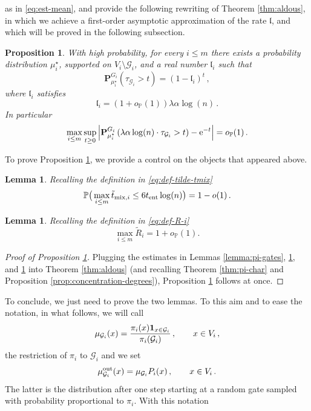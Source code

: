 \documentclass[11pt,oneside]{amsart}
\numberwithin{equation}{section}  %
\theoremstyle{plain}
\newtheorem{lemma}[theorem]{Lemma}
\newtheorem{proposition}[theorem]{Proposition}
\newcommand{\p}{\mathbb{P}}
\newcommand{\PP}{\mathbb{P}}
\newcommand{\one}{\textup{\textbf{1}}}
\newcommand{\op}{o_{\p}}
\newcommand{\tent}{t_{\textup{ent}}}
\newcommand{\quench}{\mathbf{P}}
\newcommand{\gates}{\mathcal{G}}
\newcommand{\mub}{\mu_{\gates_i}}
\newcommand{\muout}{\mu^{\rm out}_{\gates_i}}
\newcommand{\muqs}{\mu^\star_i}
\begin{document}
as in \eqref{eq:est-mean}, and provide the following rewriting of Theorem \ref{thm:aldous}, in which we achieve a first-order asymptotic approximation of the rate $\mathfrak{l}$, and which will be proved in the following subsection. 
\begin{proposition}\label{prop:rate}
	With high probability, for every $i \le m$ there exists a probability distribution $\muqs$, supported on $V_i \setminus \gates_i$, and a real number $\mathfrak{l}_i$
	such that
	\begin{equation}
		\quench^{G_i}_{\muqs} \left( \tau_{\gates_i}>t \right)=(1-\mathfrak{l}_i)^t\,,
	\end{equation}
	where $\mathfrak{l}_i$ satisfies
	\begin{equation}\label{eq:rate}
		\mathfrak{l}_i=(1+\op(1)) \lambda\alpha\log(n)\,.
	\end{equation}
	In particular
	\begin{equation}
		\max_{i \le m}\sup_{t \ge 0}\left|\quench^{G_i}_{\muqs} \left(\lambda\alpha \log(n)\cdot\tau_{\gates_i}>t \right)-{\rm e}^{-t}\right|=\op(1)\,.
	\end{equation}
\end{proposition}
To prove Proposition \ref{prop:rate}, we 
 provide a control on the objects that appeared above.
\begin{lemma}\label{lemma:T}
	Recalling the definition in \eqref{eq:def-tilde-tmix}
	\begin{equation}\label{eq:est-T}
		\PP\big(\max_{i \le m}\tilde t_{{\rm mix},i}\le 6\tent\log(n)\big)=1-o(1)\,.
	\end{equation}
\end{lemma}
\begin{lemma}\label{lemma:R-new}
	Recalling the definition in \eqref{eq:def-R-i}
	\begin{equation}
		\max_{i \le m}\tilde R_i=1+\op(1).
	\end{equation}
\end{lemma}
\begin{proof}[Proof of Proposition \ref{prop:rate}]
Plugging the estimates in Lemmas \ref{lemma:pi-gates}, \ref{lemma:T}, and \ref{lemma:R-new} into Theorem \ref{thm:aldous} (and recalling Theorem \ref{thm:pi-char} and Proposition \ref{prop:concentration-degrees}), Proposition \ref{prop:rate} follows at once.
\end{proof}
To conclude, we just need to prove the two lemmas. To this aim and to ease the notation, in what follows, we will call 
\begin{equation} \label{eq:5-26}
	\mub(x)=\frac{\pi_i(x)\one_{x\in\gates_i}}{\pi_i(\gates_i)}\,,\qquad x\in V_i\,,
\end{equation}
the restriction of $\pi_i$ to $\gates_i$ and we set
\begin{equation}\label{eq:muout}
	\muout(x)=\mub P_i(x)\,,\qquad x\in V_i\,.
\end{equation}
The latter is the distribution after one step starting at a random gate sampled with probability proportional to $\pi_i$.
With this notation
\end{document}
